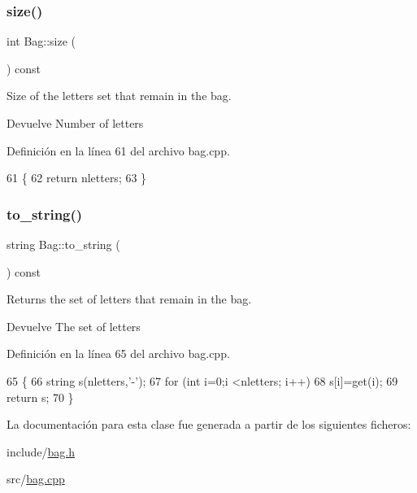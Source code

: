 \subsubsection{\texorpdfstring{size()}{size()}}
{\footnotesize\ttfamily int Bag\+::size (\begin{DoxyParamCaption}{ }\end{DoxyParamCaption}) const}



Size of the letters set that remain in the bag. 

\begin{DoxyReturn}{Devuelve}
Number of letters 
\end{DoxyReturn}


Definición en la línea 61 del archivo bag.\+cpp.


\begin{DoxyCode}
61                     \{
62     \textcolor{keywordflow}{return} nletters;
63 \}
\end{DoxyCode}
\mbox{\label{classBag_ac63bdc8c3ceed6d86db66b9d399764ab}} 
\subsubsection{\texorpdfstring{to\+\_\+string()}{to\_string()}}
{\footnotesize\ttfamily string Bag\+::to\+\_\+string (\begin{DoxyParamCaption}{ }\end{DoxyParamCaption}) const}



Returns the set of letters that remain in the bag. 

\begin{DoxyReturn}{Devuelve}
The set of letters 
\end{DoxyReturn}


Definición en la línea 65 del archivo bag.\+cpp.


\begin{DoxyCode}
65                              \{
66     \textcolor{keywordtype}{string} s(nletters,\textcolor{charliteral}{'-'});
67     \textcolor{keywordflow}{for} (\textcolor{keywordtype}{int} i=0;i <nletters; i++)
68         s[i]=\textcolor{keyword}{get}(i);
69     \textcolor{keywordflow}{return} s;
70 \}
\end{DoxyCode}


La documentación para esta clase fue generada a partir de los siguientes ficheros\+:\begin{DoxyCompactItemize}
\item 
include/\hyperlink{bag_8h}{bag.\+h}\item 
src/\hyperlink{bag_8cpp}{bag.\+cpp}\end{DoxyCompactItemize}
